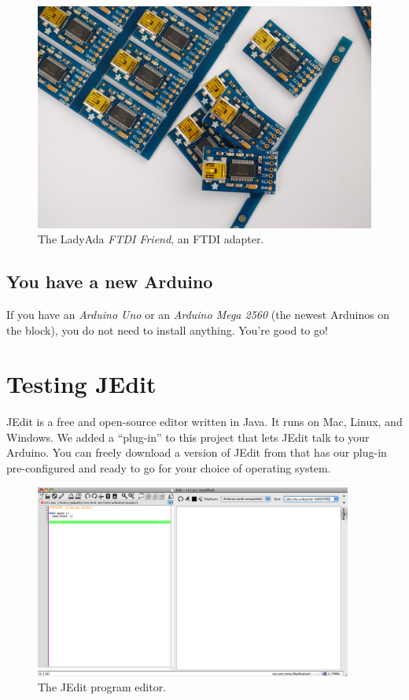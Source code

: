 \begin{figure}[ht]
  \begin{center}
    \includegraphics[width=0.8\linewidth]{images/20110115-ftdi-friend-print}
    \caption{The LadyAda {\em FTDI Friend}, an FTDI adapter.}
    \label{image:ftdi-friend}
  \end{center}
\end{figure}

\subsection{You have a new Arduino}
If you have an {\em Arduino Uno} or an {\em Arduino Mega 2560} (the newest Arduinos on the block), you do not need to install anything. You're good to go!

\section{Testing JEdit}
JEdit is a free and open-source editor written in Java. It runs on Mac, Linux, and Windows. We added a ``plug-in'' to this project that lets JEdit talk to your Arduino. You can freely download a version of JEdit from \ccc that has our plug-in pre-configured and ready to go for your choice of operating system.
      
\begin{figure}[!ht]
  \begin{center}
    \includegraphics[height=2.5in]{images/20100108-jedit-docked-occplug}
    \caption{The JEdit program editor.}
    \label{screenshot:jedit-occplug-docked}
  \end{center}
\end{figure}


